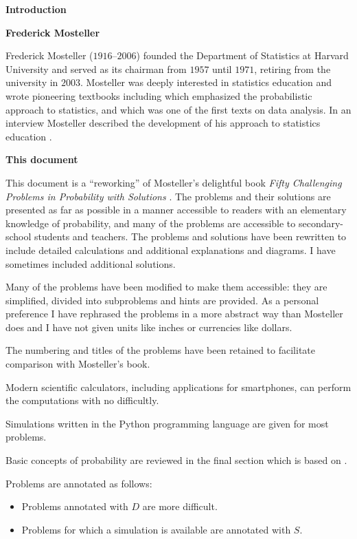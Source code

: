 \begin{center}
\textbf{\LARGE Introduction}
\end{center}


\bigskip

\textbf{Frederick Mosteller}

Frederick Mosteller ($1916$--$2006$) founded the Department of Statistics at Harvard University and served as its chairman from $1957$ until $1971$, retiring from the university in $2003$. Mosteller was deeply interested in statistics education and wrote pioneering textbooks including \cite{pwsa} which emphasized the probabilistic approach to statistics, and \cite{bsda} which was one of the first texts on data analysis. In an interview Mosteller described the development of his approach to statistics education \cite{gse}.

\medskip

\textbf{This document}

This document is a ``reworking'' of Mosteller's delightful book \textit{Fifty Challenging Problems in Probability with Solutions} \cite{fifty}. The problems and their solutions are presented as far as possible in a manner accessible to readers with an elementary knowledge of probability, and many of the problems are accessible to secondary-school students and teachers. The problems and solutions have been rewritten to include detailed calculations and additional explanations and diagrams. I have sometimes included additional solutions.

Many of the problems have been modified to make them accessible: they are simplified, divided into subproblems and hints are provided. As a personal preference I have rephrased the problems in a more abstract way than Mosteller does and I have not given units like inches or currencies like dollars.

The numbering and titles of the problems have been retained to facilitate comparison with Mosteller's book.

Modern scientific calculators, including applications for smartphones, can perform the computations with no difficultly.

Simulations written in the Python programming language are given for most problems.

Basic concepts of probability are reviewed in the final section which is based on \cite{ross}.

Problems are annotated as follows:
\begin{itemize}
\item Problems annotated with $D$ are more difficult.
\item Problems for which a simulation is available are annotated with $S$.
\end{itemize}

